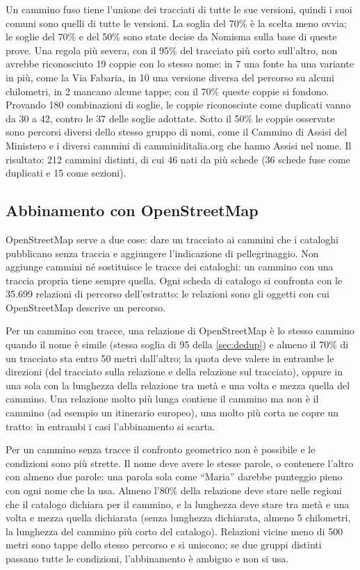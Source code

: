 Un cammino fuso tiene l'unione dei tracciati di tutte le sue versioni, quindi i suoi comuni sono quelli di tutte le versioni. La soglia del 70\% è la scelta meno ovvia; le soglie del 70\% e del 50\% sono state decise da Nomisma sulla base di queste prove. Una regola più severa, con il 95\% del tracciato più corto sull'altro, non avrebbe riconosciuto 19 coppie con lo stesso nome: in 7 una fonte ha una variante in più, come la Via Fabaria, in 10 una versione diversa del percorso su alcuni chilometri, in 2 mancano alcune tappe; con il 70\% queste coppie si fondono. Provando 180 combinazioni di soglie, le coppie riconosciute come duplicati vanno da 30 a 42, contro le 37 delle soglie adottate. Sotto il 50\% le coppie osservate sono percorsi diversi dello stesso gruppo di nomi, come il Cammino di Assisi del Ministero e i diversi cammini di camminiditalia.org che hanno Assisi nel nome. Il risultato: 212 cammini distinti, di cui 46 nati da più schede (36 schede fuse come duplicati e 15 come sezioni).

\subsection{Abbinamento con OpenStreetMap}\label{sec:osm}

OpenStreetMap serve a due cose: dare un tracciato ai cammini che i cataloghi pubblicano senza traccia e aggiungere l'indicazione di pellegrinaggio. Non aggiunge cammini né sostituisce le tracce dei cataloghi: un cammino con una traccia propria tiene sempre quella. Ogni scheda di catalogo si confronta con le 35.699 relazioni di percorso dell'estratto: le relazioni sono gli oggetti con cui OpenStreetMap descrive un percorso.

Per un cammino con tracce, una relazione di OpenStreetMap è lo stesso cammino quando il nome è simile (stessa soglia di 95 della \cref{sec:dedup}) e almeno il 70\% di un tracciato sta entro 50 metri dall'altro; la quota deve valere in entrambe le direzioni (del tracciato sulla relazione e della relazione sul tracciato), oppure in una sola con la lunghezza della relazione tra metà e una volta e mezza quella del cammino. Una relazione molto più lunga contiene il cammino ma non è il cammino (ad esempio un itinerario europeo), una molto più corta ne copre un tratto: in entrambi i casi l'abbinamento si scarta.

Per un cammino senza tracce il confronto geometrico non è possibile e le condizioni sono più strette. Il nome deve avere le stesse parole, o contenere l'altro con almeno due parole: una parola sola come “Maria” darebbe punteggio pieno con ogni nome che la usa. Almeno l'80\% della relazione deve stare nelle regioni che il catalogo dichiara per il cammino, e la lunghezza deve stare tra metà e una volta e mezza quella dichiarata (senza lunghezza dichiarata, almeno 5 chilometri, la lunghezza del cammino più corto del catalogo). Relazioni vicine meno di 500 metri sono tappe dello stesso percorso e si uniscono; se due gruppi distinti passano tutte le condizioni, l'abbinamento è ambiguo e non si usa.

